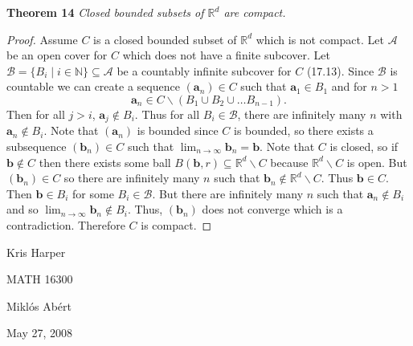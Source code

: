 \documentclass{article}
\begin{document}
\begin{flushleft}
\textbf{Theorem 14}
\textsl{Closed bounded subsets of $\mathbb{R}^d$ are compact.}
\begin{proof}
Assume $C$ is a closed bounded subset of $\mathbb{R}^d$ which is not compact. Let $\mathcal{A}$ be an open cover for $C$ which does not have a finite subcover. Let $\mathcal{B} = \{B_i \mid i \in \mathbb{N}\} \subseteq \mathcal{A}$ be a countably infinite subcover for $C$ (17.13). Since $\mathcal{B}$ is countable we can create a sequence $(\mathbf{a}_n) \in C$ such that $\mathbf{a}_1 \in B_1$ and for $n>1$
\[
\mathbf{a}_n \in C \backslash (B_1 \cup B_2 \cup \dots B_{n-1}).
\]
Then for all $j > i$, $\mathbf{a}_j \notin B_i$. Thus for all $B_i \in \mathcal{B}$, there are infinitely many $n$ with $\mathbf{a}_n \notin B_i$. Note that $(\mathbf{a}_n)$ is bounded since $C$ is bounded, so there exists a subsequence $(\mathbf{b}_n) \in C$ such that $\lim_{n \rightarrow \infty} \mathbf{b}_n = \mathbf{b}$. Note that $C$ is closed, so if $\mathbf{b} \notin C$ then there exists some ball $B(\mathbf{b}, r) \subseteq \mathbb{R}^d \backslash C$ because $\mathbb{R}^d \backslash C$ is open. But $(\mathbf{b}_n) \in C$ so there are infinitely many $n$ such that $\mathbf{b}_n \notin \mathbb{R}^d \backslash C$. Thus $\mathbf{b} \in C$. Then $\mathbf{b} \in B_i$ for some $B_i \in \mathcal{B}$. But there are infinitely many $n$ such that $\mathbf{a}_n \notin B_i$ and so $\lim_{n \rightarrow \infty} \mathbf{b}_n \notin B_i$. Thus, $(\mathbf{b}_n)$ does not converge which is a contradiction. Therefore $C$ is compact.
\end{proof}

\end{flushleft}

\newpage

\begin{flushright}
Kris Harper

MATH 16300

Mikl\'{o}s Ab\'{e}rt

May 27, 2008
\end{flushright}
\end{document}
